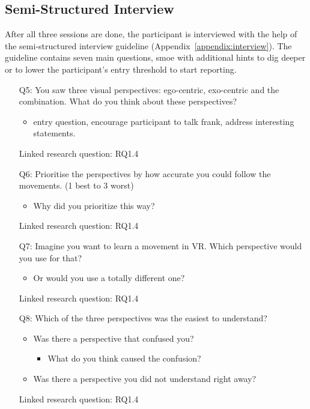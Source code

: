 \subsection{Semi-Structured Interview}
After all three sessions are done, the participant is interviewed with the help of the semi-structured interview guideline (Appendix~\ref{appendix:interview}). The guideline contains seven main questions, smoe with additional hints to dig deeper or to lower the participant's entry threshold to start reporting.
\begin{itemize}
	\item[Q5:] You saw three visual perspectives: ego-centric, exo-centric and the combination. What do you think about these perspectives?
	\begin{itemize}
		\item entry question, encourage participant to talk frank, address interesting statements.
	\end{itemize}
	\item[] Linked research question: RQ1.4
	
	\item[Q6:] Prioritise the perspectives by how accurate you could follow the movements. (1 best to 3 worst) 	
	\begin{itemize}
		\item Why did you prioritize this way?
	\end{itemize}
	\item[] Linked research question: RQ1.4
	
	\item[Q7:] Imagine you want to learn a movement in VR. Which perspective would you use for that?
	\begin{itemize}
		\item Or would you use a totally different one?
	\end{itemize}
	\item[] Linked research question: RQ1.4
	
	\item[Q8:] Which of the three perspectives was the easiest to understand? 
	\begin{itemize}
		\item Was there a perspective that confused you?
		\begin{itemize}
			\item What do you think caused the confusion?
		\end{itemize}
		\item Was there a perspective you did not understand right away?
	\end{itemize}
	\item[] Linked research question: RQ1.4
	

\end{itemize}
